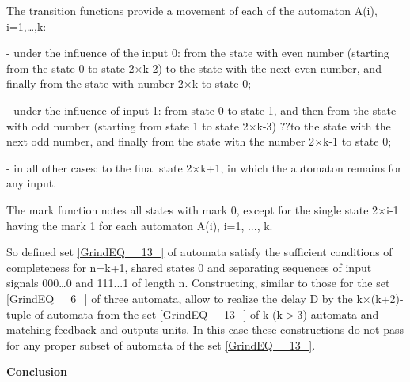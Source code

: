 \documentclass{article}
\begin{document}
The transition functions provide a movement of each of the automaton A(i), i=1,\dots ,k:

- under the influence of the input 0: from the state with even number (starting from the state 0 to state 2$\times$k-2) to the state with the next even number, and finally from the state with number 2$\times$k to state 0;

- under the influence of input 1: from state 0 to state 1, and then from the state with odd number (starting from state 1 to state 2$\times$k-3) $?$$?$to the state with the next odd number, and finally from the state with the number 2$\times$k-1 to state 0;

- in all other cases: to the final state 2$\times$k+1, in which the automaton remains for any input.

The mark function notes all states with mark 0, except for the single state 2$\times$i-1 having the mark 1 for each automaton A(i), i=1, ..., k.

So defined set \eqref{GrindEQ__13_} of automata satisfy the sufficient conditions of completeness for n=k+1, shared states 0 and separating sequences of input signals 000\dots 0 and 111...1 of length n. Constructing, similar to those for the set \eqref{GrindEQ__6_} of three automata, allow to realize the delay D by the  k$\times$(k+2)-tuple of automata from the set \eqref{GrindEQ__13_} of k (k$>$3) automata and matching feedback and outputs units. In this case these constructions do not pass for any proper subset of automata of the set \eqref{GrindEQ__13_}.

\textbf{Conclusion }
\end{document}
